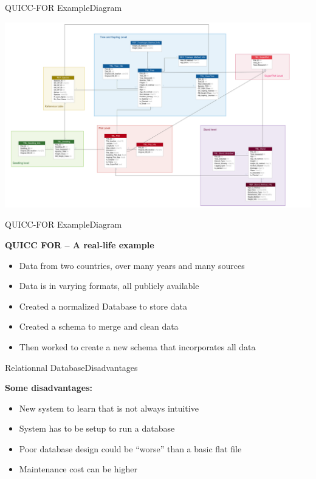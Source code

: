 \documentclass[table]{eecslides}
\begin{document}
\begin{frame}{QUICC-FOR Example}{Diagram}

\vspace{0.2cm}
	\begin{center}
		\includegraphics[width=0.8\paperwidth]{UML_QUICC.png}
	\end{center}

\end{frame}


\begin{frame}{QUICC-FOR Example}{Diagram}

\textbf{QUICC FOR – A real-life example}
\begin{itemize}
	\item Data from two countries, over many years and many sources
	\item Data is in varying formats, all publicly available
	\item Created a normalized Database to store data
	\item Created a schema to merge and clean data
	\item Then worked to create a new schema that incorporates all data
\end{itemize}

\end{frame}


\begin{frame}{Relationnal Database}{Disadvantages}

\textbf{Some disadvantages:}
	\begin{itemize}
		\item New system to learn that is not always intuitive
		\item System has to be setup to run a database
		\item Poor database design could be “worse” than a basic flat file
		\item Maintenance cost can be higher
	\end{itemize}

\end{frame}
\end{document}
